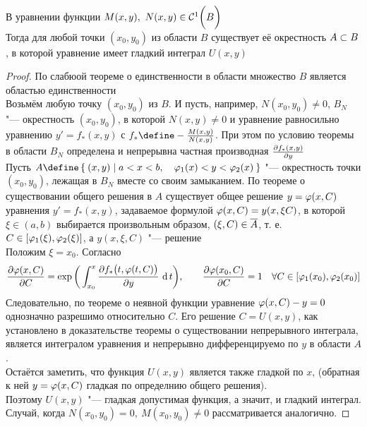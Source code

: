\begin{theorem}
    \hfill \\
    В уравнении  функции $ M(x, y), ~ N(x, y) \in \Cont[1]B $ \\
    Тогда для любой точки $ (x_0, y_0) $ из области $ B $ существует её окрестность $ A \sub B $, в которой уравнение  имеет гладкий интеграл $ U(x, y) $
\end{theorem}

\begin{proof}
	По слабюой теореме о единственности в области множество $ B $ является областью единственности \\
    Возьмём любую точку $ (x_0, y_0) $ из $ B $. И пусть, например, $ N(x_0, y_0) \ne 0 $, $ B_N $ "--- окрестность $ (x_0, y_0) $, в которой $ N(x, y) \ne 0 $ и уравнение  равносильно уравнению  $ y' = f_*(x, y) $ с $ f_* \define - \frac{M(x, y)}{N(x, y)} $. При этом по условию теоремы в области $ B_N $ определена и непрерывна частная производная $ \pder{f_*(x, y)}y $ \\
    Пусть $ A \define \set{(x, y) | a < x < b, \quad \vphi_1(x) < y < \vphi_2(x)} $ "--- окрестность точки $ (x_0, y_0) $, лежащая в $ B_N $ вместе со своим замыканием. По теореме о существовании общего решения в $ A $ существует общее решение $ y = \vphi(x, C) $ уравнения $ y' = f_*(x, y) $, задаваемое формулой  $ \vphi(x, C) = y(x, \xi C) $, в которой $ \xi \in (a, b) $ выбирается произвольным образом, $ (\xi, C) \in \ol{A} $, т. е. $ C \in [\vphi_1(\xi), \vphi_2(\xi)] $, а $ y(x, \xi, C) $ "--- решение  \\
    Положим $ \xi = x_0 $. Согласно 
    $$ \pder{\vphi(x, C)}C = \exp \bigg( \dint[t]{x_0}x{\pder{f_* \big( t, \vphi(t, C) \big)}y} \bigg), \qquad \pder{\vphi(x_0, C)}C = 1 \quad \forall C \in [\vphi_1(x_0), \vphi_2(x_0)] $$
    Следовательно, по теореме о неявной функции уравнение $ \vphi(x, C) - y = 0 $ однозначно разрешимо относительно $ C $. Его решение $ C = U(x, y) $, как установлено в доказательстве теоремы о существовании непрерывного интеграла, является интегралом уравнения  и непрерывно дифференцируемо по $ y $ в области $ A $. \\
    Остаётся заметить, что функция $ U(x, y) $ является также гладкой по $ x $, (\as обратная к ней $ y = \vphi(x, C) $ гладкая по определнию общего решения). \\
    Поэтому $ U(x, y) $ "--- гладкая допустимая функция, а значит, и гладкий интеграл. \\
    Случай, когда $ N(x_0, y_0) = 0, ~ M(x_0, y_0) \ne 0 $ рассматривается аналогично.
\end{proof}

